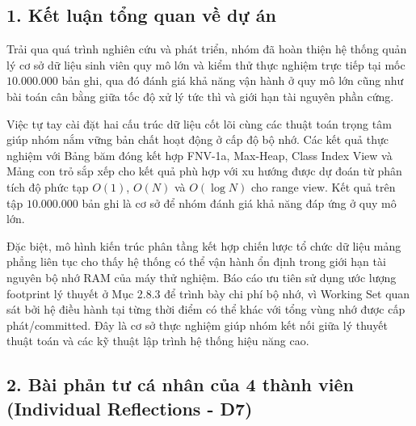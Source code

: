 \documentclass[14pt,a4paper]{extarticle}
\begin{document}
\subsection*{1. Kết luận tổng quan về dự án}
{}

Trải qua quá trình nghiên cứu và phát triển, nhóm đã hoàn thiện hệ thống quản lý cơ sở dữ liệu sinh viên quy mô lớn và kiểm thử thực nghiệm trực tiếp tại mốc $10.000.000$ bản ghi, qua đó đánh giá khả năng vận hành ở quy mô lớn cũng như bài toán cân bằng giữa tốc độ xử lý tức thì và giới hạn tài nguyên phần cứng.

Việc tự tay cài đặt hai cấu trúc dữ liệu cốt lõi cùng các thuật toán trọng tâm giúp nhóm nắm vững bản chất hoạt động ở cấp độ bộ nhớ. Các kết quả thực nghiệm với Bảng băm đóng kết hợp FNV-1a, Max-Heap, Class Index View và Mảng con trỏ sắp xếp cho kết quả phù hợp với xu hướng được dự đoán từ phân tích độ phức tạp $O(1)$, $O(N)$ và $O(\log N)$ cho range view. Kết quả trên tập $10.000.000$ bản ghi là cơ sở để nhóm đánh giá khả năng đáp ứng ở quy mô lớn.

Đặc biệt, mô hình kiến trúc phân tầng kết hợp chiến lược tổ chức dữ liệu mảng phẳng liên tục cho thấy hệ thống có thể vận hành ổn định trong giới hạn tài nguyên bộ nhớ RAM của máy thử nghiệm. Báo cáo ưu tiên sử dụng ước lượng footprint lý thuyết ở Mục 2.8.3 để trình bày chi phí bộ nhớ, vì Working Set quan sát bởi hệ điều hành tại từng thời điểm có thể khác với tổng vùng nhớ được cấp phát/committed. Đây là cơ sở thực nghiệm giúp nhóm kết nối giữa lý thuyết thuật toán và các kỹ thuật lập trình hệ thống hiệu năng cao.

\subsection*{2. Bài phản tư cá nhân của 4 thành viên (Individual Reflections - D7)}
{}
\end{document}
